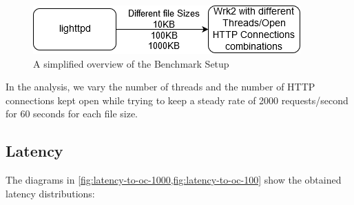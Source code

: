 \documentclass[runningheads]{llncs}
\newcommand{\jk}[1]{}
\newcommand{\fg}[1]{}
\begin{document}
\begin{figure}[H]
\centering
\includegraphics[width=.6\linewidth]{wrk2bench.png}
\caption{A simplified overview of the Benchmark Setup}
\label{fig:wrk2bench}
\end{figure}
In the analysis, we vary the number of threads and the number of HTTP connections kept open while trying to keep a steady rate of 2000 requests/second for 60 seconds for each file size.

\subsection{Latency}\label{subsec:latency}
The diagrams in \cref{fig:latency-to-oc-1000,fig:latency-to-oc-100} show the obtained latency distributions:
\jk{Die Bilder kann man nicht lesen. Text ist einfach zu klein. ca. +80-100\%}
\jk{Immer noch zu klein}
\fg{und nun?}
\end{document}
